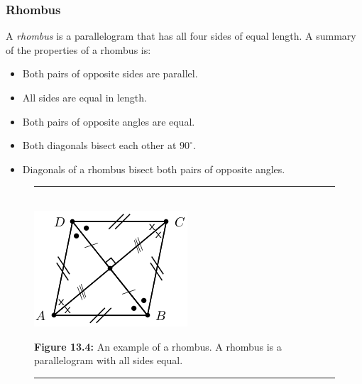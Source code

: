             \subsubsection{ Rhombus}
            \nopagebreak
          \label{m39354*id319041}A \textsl{rhombus} is a parallelogram that has all four sides of equal length. A summary of the properties of a rhombus is:\par 
          \label{m39354*id319051}\begin{itemize}[noitemsep]
            \label{m39354*uid70}\item Both pairs of opposite sides are parallel.
\label{m39354*uid71}\item All sides are equal in length.
\label{m39354*uid72}\item Both pairs of opposite angles are equal.
\label{m39354*uid73}\item Both diagonals bisect each other at \begin{math}{90}^{\circ }\end{math}.
\label{m39354*uid74}\item Diagonals of a rhombus bisect both pairs of opposite angles.
\end{itemize}
    \setcounter{subfigure}{0}
	\begin{figure}[H] %
    \begin{center}
    \rule[.1in]{\figurerulewidth}{.005in} \\
        \label{m39354*uid75!!!underscore!!!media}\label{m39354*uid75!!!underscore!!!printimage}\includegraphics{col11306.imgs/m39354_MG10C13_043.png} %
      \vspace{2pt}
    \vspace{\rubberspace}\par \begin{cnxcaption}
	  \small \textbf{Figure 13.4: }An example of a rhombus. A rhombus is a parallelogram with all sides equal.
	\end{cnxcaption}
    \vspace{.1in}
    \rule[.1in]{\figurerulewidth}{.005in} \\
    \end{center}
 \end{figure}       
        \label{m39354*uid76}
